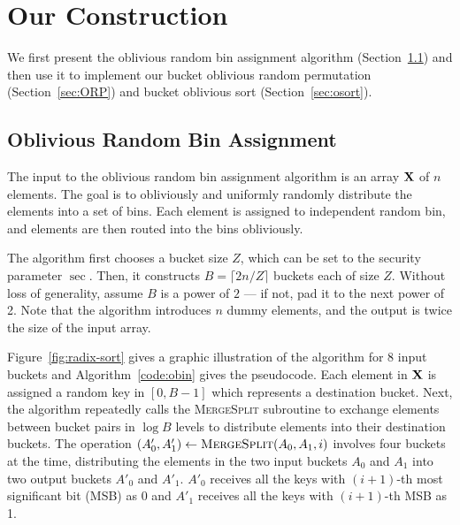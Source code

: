 \section{Our Construction} 
\label{sec:construction}
\label{sec:random-bin-assignment}

We first present the oblivious random bin assignment algorithm (Section~\ref{sec:obin})  and then use it to implement our bucket oblivious random permutation (Section~\ref{sec:ORP}) and bucket oblivious sort (Section~\ref{sec:osort}).

\newcommand{\val}{{\sf value}}
\newcommand{\pref}{{\sf pref}}


\subsection{Oblivious Random Bin Assignment}
\label{sec:obin}

The input to the oblivious random bin assignment algorithm is an array $\mathbf{X}$ of $n$ elements. 
The goal is to obliviously and uniformly randomly distribute the elements into a set of bins. Each element is assigned to independent random bin, and elements are then routed into the bins obliviously. 

The algorithm first chooses a bucket size $Z$, which can be set to the security parameter $\sec$. 
Then, it constructs $B=\lceil 2n/Z \rceil$ buckets each of size $Z$.
Without loss of generality, assume $B$ is a power of $2$ --- if not, pad it to the next power of 2. Note that the algorithm introduces $n$ dummy elements, and the output is twice the size of the input array. %


Figure~\ref{fig:radix-sort} gives a graphic illustration of the algorithm for 8 input buckets and Algorithm~\ref{code:obin} gives the pseudocode.
Each element in $\mathbf{X}$ is assigned a random key in $[0, B-1]$ which represents a destination bucket.
Next, the algorithm repeatedly calls the \textsc{MergeSplit} subroutine to exchange elements between bucket pairs in $\log B$ levels to distribute elements into their destination buckets. 
The operation $(A'_0,A'_1)\leftarrow \textsc{MergeSplit}(A_0,A_1,i)$ involves four buckets at the time, distributing the elements in the two input buckets $A_0$ and $A_1$ into two output buckets $A'_0$ and $A'_1$.
$A'_0$ receives all the keys with $(i+1)$-th most significant bit (MSB) as 0 and $A'_1$ receives all the keys with $(i+1)$-th MSB as 1.



